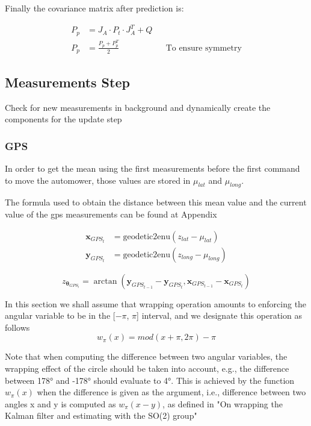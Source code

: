 Finally the covariance matrix after prediction is:

\begin{align}
    P_{p} & = J_A \cdot P_t \cdot J_A^T + Q && \\
    P_{p} & =  \frac{P_{p} +  P_{p}^T}{2} && \text{To ensure symmetry}
\end{align}


\subsection{Measurements Step}
Check for new measurements in background and dynamically create the components for the update step

\subsubsection{GPS}

In order to get the mean using the first measurements before the first command to move the automower, those values are stored in $\mu_{lat}$ and $\mu_{long}$.

The formula used to obtain the distance between this mean value and the current value of the gps measurements can be found at Appendix

\begin{align}
\mathbf{x}_{GPS_t} & = \text{geodetic2enu}( z_{lat} - \mu_{lat})\\
\mathbf{y}_{GPS_t} & = \text{geodetic2enu}( z_{long} - \mu_{long})
\end{align}

\begin{equation}
z_{\boldsymbol \theta_{GPS_t}} = \arctan(\mathbf{y}_{GPS_{t-1}} - \mathbf{y}_{GPS_t}, \mathbf{x}_{GPS_{t-1}} - \mathbf{x}_{GPS_t} )
\end{equation}

In this section we shall assume that wrapping operation
amounts to enforcing the angular variable to be in the [$-\pi$, $\pi$]
interval, and we designate this operation as follows
\begin{equation}
w_{\pi}(x) = mod(x + \pi, 2\pi) - \pi
\end{equation}

Note that when computing the difference between two angular
variables, the wrapping effect of the circle should be taken into
account, e.g., the difference between 178° and -178° should
evaluate to 4°. This is achieved by the function $w_{\pi}(x)$ when the difference
is given as the argument, i.e., difference between two angles
x and y is computed as $w_{\pi}(x-y)$, as defined in "On wrapping the Kalman filter and estimating with
the SO(2) group"

